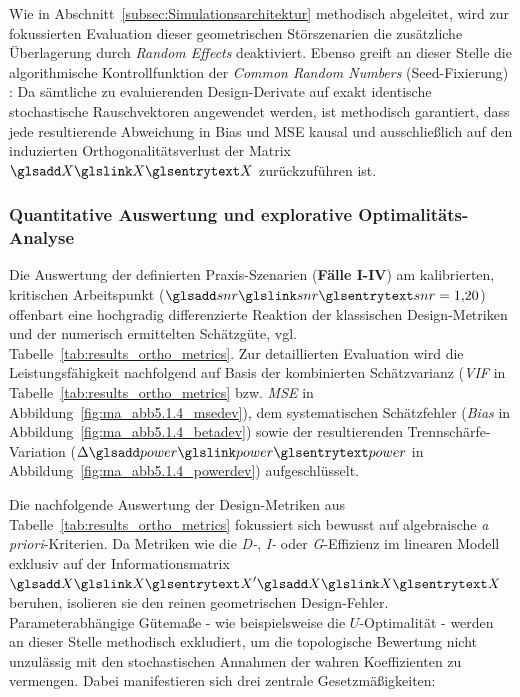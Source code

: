 Wie in Abschnitt~\ref{subsec:Simulationsarchitektur} methodisch abgeleitet, wird zur fokussierten Evaluation dieser geometrischen Störszenarien die zusätzliche Überlagerung durch \textit{Random Effects} deaktiviert.
Ebenso greift an dieser Stelle die algorithmische Kontrollfunktion der \textit{Common Random Numbers} (Seed-Fixierung) \cite{Zio.2013}:
Da sämtliche zu evaluierenden Design-Derivate auf exakt identische stochastische Rauschvektoren angewendet werden, ist methodisch garantiert, dass jede resultierende Abweichung in Bias und \ac{MSE} kausal und ausschließlich auf den induzierten Orthogonalitätsverlust der Matrix $\sym{X}$ zurückzuführen ist.

\subsubsection{Quantitative Auswertung und explorative Optimalitäts-Analyse} \label{subsubsec:quantiplore}

Die Auswertung der definierten Praxis-Szenarien (\textbf{Fälle I-IV}) am kalibrierten, kritischen Arbeitspunkt ($\sym{snr} = 1{,}20$) offenbart eine hochgradig differenzierte Reaktion der klassischen Design-Metriken und der numerisch ermittelten Schätzgüte, vgl. Tabelle~\ref{tab:results_ortho_metrics}.
Zur detaillierten Evaluation wird die Leistungsfähigkeit nachfolgend auf Basis der kombinierten Schätzvarianz (\textit{\ac{VIF}} in Tabelle~\ref{tab:results_ortho_metrics} bzw. \textit{\ac{MSE}} in Abbildung~\ref{fig:ma_abb5.1.4_msedev}), dem systematischen Schätzfehler (\textit{Bias} in Abbildung~\ref{fig:ma_abb5.1.4_betadev}) sowie der resultierenden Trennschärfe-Variation ($\Delta \sym{power}$ in Abbildung~\ref{fig:ma_abb5.1.4_powerdev}) aufgeschlüsselt.

Die nachfolgende Auswertung der Design-Metriken aus Tabelle~\ref{tab:results_ortho_metrics} fokussiert sich bewusst auf algebraische \textit{a priori}-Kriterien.
Da Metriken wie die \textit{D-}, \textit{I-} oder \textit{G}-Effizienz im linearen Modell exklusiv auf der Informationsmatrix $\sym{X}'\sym{X}$ beruhen, isolieren sie den reinen geometrischen Design-Fehler.
Parameterabhängige Gütemaße - wie beispielsweise die $U$-Optimalität - werden an dieser Stelle methodisch exkludiert, um die topologische Bewertung nicht unzulässig mit den stochastischen Annahmen der wahren Koeffizienten zu vermengen.
Dabei manifestieren sich drei zentrale Gesetzmäßigkeiten:

